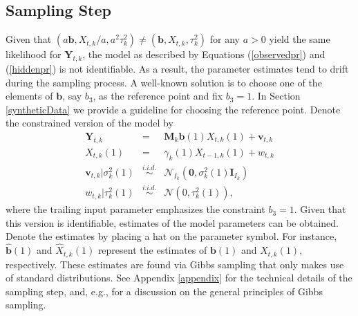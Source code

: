 \documentclass[aoas, preprint]{imsart}
\numberwithin{equation}{section}
\theoremstyle{plain}
\begin{document}
\subsection{Sampling Step}
\label{sampling_step}
Given that $\left(a \boldsymbol{b}, X_{t,k}/a, a^2 \tau_k^2\right) \neq \left(\boldsymbol{b}, X_{t,k}, \tau_k^2\right)$ for any $a > 0$ yield the same  likelihood for $\boldsymbol{Y}_{t,k}$, the model as described by Equations (\ref{observedpr}) and (\ref{hiddenpr}) is not identifiable. As a result, the parameter estimates tend to drift during the sampling process. A well-known solution is to choose one of the elements of $\boldsymbol{b}$, say $b_3$, as the reference point and fix $b_3 = 1$.  In Section \ref{syntheticData} we provide a guideline for choosing the reference point. Denote the constrained version of the model by
\begin{eqnarray*}
\boldsymbol{Y}_{t, k} &=&  \boldsymbol{M}_k \boldsymbol{b} (1) X_{t, k}(1)+ \boldsymbol{v}_{t, k}\\
X_{t, k}(1) &=& \gamma_k(1) X_{t-1, k}(1) + w_{t, k}\\
\boldsymbol{v}_{t, k} | \sigma^2_k(1) &\stackrel{i.i.d.}{\sim}& \mathcal{N}_{I_k}(\boldsymbol{0}, \sigma^2_k(1) \boldsymbol{I}_{I_k})\\
w_{t, k} | \tau^2_k(1) &\stackrel{i.i.d.}{\sim}& \mathcal{N}\left(0, \tau^2_k(1)\right),
\end{eqnarray*}
where the trailing input parameter emphasizes the constraint $b_{3} = 1$. Given that this version is identifiable, estimates of the model parameters can be obtained. Denote the estimates by placing a hat on the parameter symbol. For instance, $\hat{\boldsymbol{b}}(1)$ and $\hat{X}_{t, k}(1)$ represent the estimates of $\boldsymbol{b}(1)$ and $X_{t, k}(1)$, respectively. These estimates are found via Gibbs sampling that only makes use of standard distributions. See Appendix \ref{appendix} for the technical details of the sampling step, and, e.g., \citet{gelman2003bayesian} for a discussion on the general principles of Gibbs sampling. 
\end{document}
